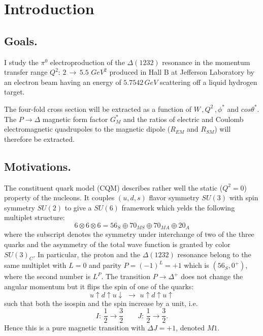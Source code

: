 \section{Introduction}
\subsection{Goals.}
I study the $\pi^0$ electroproduction of the $\Delta(1232)$ resonance in the momentum transfer range
$Q^2:\, 2\,\rightarrow\,5.5\,\,GeV^2$ produced in Hall B at  Jefferson Laboratory
by an electron beam having an energy of $5.7542\,GeV$ scattering off a liquid hydrogen target.

The four-fold cross section will be extracted as a function of $W\, ,Q^2\, ,\phi^*$ and $cos\theta^*$.
The $P\rightarrow \Delta$ magnetic form factor $G_M^*$ and the ratios of electric and Coulomb
electromagnetic quadrupoles to the magnetic dipole ($R_{EM}$ and $R_{SM}$) will therefore be extracted.

\subsection{Motivations.}
The constituent quark model (CQM) describes rather well the static ($Q^2=0$) property of the nucleons.
It couples $(u,d,s)$ flavor symmetry $SU(3)$ with spin symmetry $SU(2)$ to give a $SU(6)$ framework
which yelds the following multiplet structure:
$$6\otimes 6\otimes 6 = 56_S \oplus 70_{MS} \oplus 70_{MA} \oplus 20_{A} $$ 
where the subscript denotes the symmetry under interchange of two of the three quarks and the asymmetry
of the total wave function is granted by color $SU(3)_C$. 
In particular, the
proton and the $\Delta(1232)$ resonance belong to the same multiplet with $L=0$ and parity $P=(-1)^L=+1$
which is $(56_S, 0^+)$, where the second number is $L^P$. 
The transition $P\rightarrow\Delta^+$ does not change the angular momentum 
 but it flips the spin of one of the quarks:
$$
u\uparrow d\uparrow u\downarrow\,\,\longrightarrow\,\, u\uparrow d\uparrow u\uparrow
$$
such that both the isospin and the spin increase by a unit, i.e. 
$$I:\,\frac{1}{2}\rightarrow\frac{3}{2}  \qquad  J:\,\frac{1}{2}\rightarrow\frac{3}{2}    .$$
Hence this is a pure magnetic transition with $\Delta J=+1$, denoted $M1$.

